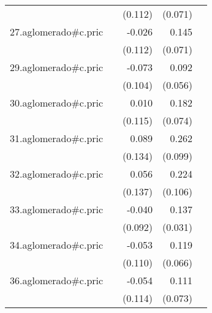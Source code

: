 {\begin{longtable}{l*{4}{D{.}{.}{-1}}}
            &                     &     (0.112)         &     (0.071)         &                     \\
\addlinespace
27.aglomerado#c.pric&                     &      -0.026         &       0.145\sym{*}  &                     \\
            &                     &     (0.112)         &     (0.071)         &                     \\
\addlinespace
29.aglomerado#c.pric&                     &      -0.073         &       0.092         &                     \\
            &                     &     (0.104)         &     (0.056)         &                     \\
\addlinespace
30.aglomerado#c.pric&                     &       0.010         &       0.182\sym{*}  &                     \\
            &                     &     (0.115)         &     (0.074)         &                     \\
\addlinespace
31.aglomerado#c.pric&                     &       0.089         &       0.262\sym{**} &                     \\
            &                     &     (0.134)         &     (0.099)         &                     \\
\addlinespace
32.aglomerado#c.pric&                     &       0.056         &       0.224\sym{*}  &                     \\
            &                     &     (0.137)         &     (0.106)         &                     \\
\addlinespace
33.aglomerado#c.pric&                     &      -0.040         &       0.137\sym{***}&                     \\
            &                     &     (0.092)         &     (0.031)         &                     \\
\addlinespace
34.aglomerado#c.pric&                     &      -0.053         &       0.119         &                     \\
            &                     &     (0.110)         &     (0.066)         &                     \\
\addlinespace
36.aglomerado#c.pric&                     &      -0.054         &       0.111         &                     \\
            &                     &     (0.114)         &     (0.073)         &                     \\

\end{longtable}}
